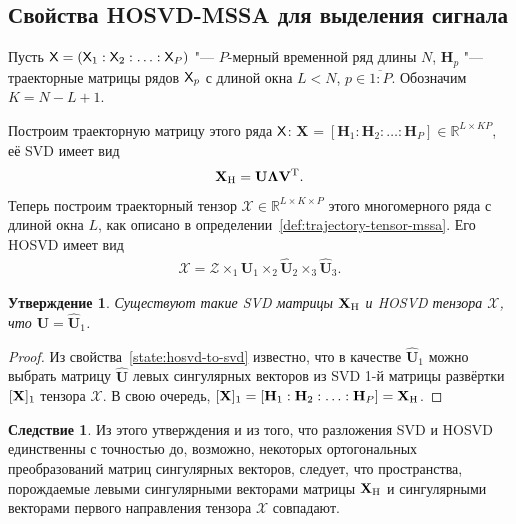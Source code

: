 \documentclass[specialist,
    substylefile=spbu.rtx,
    subf,href,colorlinks=true, 12pt]{disser}
\theoremstyle{plain}
\newtheorem{statement}{Утверждение}[section]
\theoremstyle{definition}
\newtheorem*{corollary}{Следствие}
\theoremstyle{remark}
\begin{document}
    \subsection{Свойства HOSVD-MSSA для выделения сигнала}\label{subsec:hosvd-mssa-signal-properties}
    Пусть $\mathsf{X} = \left(\mathsf{X}_1: \mathsf{X}_2:\ldots: \mathsf{X}_P\right)$ "--- $P$-мерный временной ряд длины $N$,
    $\mathbf{H}_p$ "--- траекторные матрицы рядов $\mathsf{X}_p$ с длиной окна $L < N$, $p\in \overline{1:P}$.
    Обозначим $K = N - L + 1$.

    Построим траекторную матрицу этого ряда $\mathsf{X}$:
    $\mathbf{X}_{} = [\mathbf{H}_1: \mathbf{H}_2: \ldots: \mathbf{H}_P] \in \mathbb{R}^{L\times KP}$,
    её SVD имеет вид
    \begin{gather*}
        \mathbf{X}_{\mathrm{H}} =\mathbf{U} \mathbf{\Lambda} \mathbf{V}^{\mathrm{T}}.
    \end{gather*}
    Теперь построим траекторный тензор $\mathcal{X}\in \mathbb{R}^{L\times K \times P}$ этого многомерного ряда
    с длиной окна $L$, как описано в определении~\ref{def:trajectory-tensor-mssa}.
    Его HOSVD имеет вид
    \begin{gather}
        \mathcal{X}=\mathcal{Z} \times_1 \widehat{\mathbf{U}}_1 \times_2 \widehat{\mathbf{U}}_2
        \times_3 \widehat{\mathbf{U}}_3.
        \label{eq:subspace-tens-hosvd}
    \end{gather}

    \begin{statement}
        Существуют такие \emph{SVD} матрицы $\mathbf{X}_{\mathrm{H}}$ и \emph{HOSVD} тензора $\mathcal{X}$, что
        $\mathbf{U} = \widehat{\mathbf{U}}_1$.\label{state:tens-mssa-rank}
    \end{statement}

    \begin{proof}
        Из свойства~\ref{state:hosvd-to-svd} известно, что в качестве $\widehat{\mathbf{U}}_1$ можно выбрать матрицу
        $\widehat{\mathbf{U}}$ левых сингулярных векторов из SVD 1-й матрицы развёртки $[\mathbf{X}]_{1}$
        тензора $\mathcal{X}$.
        В свою очередь, $[\mathbf{X}]_{1} = [\mathbf{H}_1: \mathbf{H}_2: \ldots: \mathbf{H}_P] = \mathbf{X}_{\mathrm{H}}$.
    \end{proof}

    \begin{corollary}
        Из этого утверждения и из того, что разложения SVD и HOSVD единственны с точностью
        до, возможно, некоторых ортогональных преобразований матриц сингулярных векторов,
        следует, что пространства, порождаемые левыми сингулярными векторами матрицы $\mathbf{X}_{\mathrm{H}}$
        и сингулярными векторами первого направления тензора $\mathcal{X}$ совпадают.
    \end{corollary}
\end{document}
